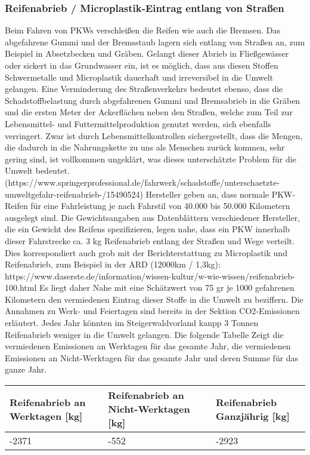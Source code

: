 \documentclass[fontsize=12pt,a4paper]{scrreprt}
\begin{document}
\subsubsection{Reifenabrieb / Microplastik-Eintrag entlang von Straßen}
Beim Fahren von PKWs verschleißen die Reifen wie auch die Bremsen. Das abgefahrene Gummi und der Bremsstaub lagern sich entlang von Straßen an, zum Beispiel in Absetzbecken und Gräben. Gelangt dieser Abrieb in Fließgewässer oder sickert in das Grundwasser ein, ist es möglich, dass aus diesen Stoffen Schwermetalle und Microplastik dauerhaft und irreversibel in die Umwelt gelangen. Eine Verminderung des Straßenverkehrs bedeutet ebenso, dass die Schadstoffbelastung durch abgefahrenen Gummi und Bremsabrieb in die Gräben und die ersten Meter der Ackerflächen neben den Straßen, welche zum Teil zur Lebensmittel- und Futtermittelproduktion genutzt werden, sich ebenfalls verringert. Zwar ist durch Lebensmittelkontrollen sichergestellt, dass die Mengen, die dadurch in die Nahrungskette zu uns als Menschen zurück kommen, sehr gering sind, ist vollkommen ungeklärt, was dieses unterschätzte Problem für die Umwelt bedeutet. (https://www.springerprofessional.de/fahrwerk/schadstoffe/unterschaetzte-umweltgefahr-reifenabrieb-/15490524)
\newline
\newline
Hersteller geben an, dass normale PKW-Reifen für eine Fahrleistung je nach Fahrstil von 40.000 bis 50.000 Kilometern ausgelegt sind. Die Gewichtsangaben aus Datenblättern verschiedener Hersteller, die ein Gewicht des Reifens spezifizieren, legen nahe, dass ein PKW innerhalb dieser Fahrstrecke ca. 3 kg Reifenabrieb entlang der Straßen und Wege verteilt. Dies korrespondiert auch grob mit der Berichterstattung zu Microplastik und Reifenabrieb, zum Beispiel in der ARD (12000km / 1,3kg): https://www.daserste.de/information/wissen-kultur/w-wie-wissen/reifenabrieb-100.html
\newline
\newline
Es liegt daher Nahe mit eine Schätzwert von 75 gr je 1000 gefahrenen Kilometern den vermiedenen Eintrag dieser Stoffe in die Umwelt zu beziffern. Die Annahmen zu Werk- und Feiertagen sind bereits in der Sektion CO2-Emissionen erläutert.
\newline
\newline
Jedes Jahr könnten im Steigerwaldvorland kanpp 3 Tonnen Reifenabrieb weniger in die Umwelt gelangen.
\newline
\newline
Die folgende Tabelle Zeigt die vermiedenen Emissionen an Werktagen für das gesamte Jahr, die vermiedenen Emissionen an Nicht-Werktagen für das gesamte Jahr und deren Summe für das ganze Jahr.
\newline
\newline
\begin{tabular}{|l | l | l |}
        \hline
        Reifenabrieb an Werktagen [kg] & Reifenabrieb an Nicht-Werktagen [kg] & Reifenabrieb Ganzjährig [kg]\\ 
        \hline
        -2371 & -552 & -2923\\ 
        \hline
\end{tabular}
\end{document}

